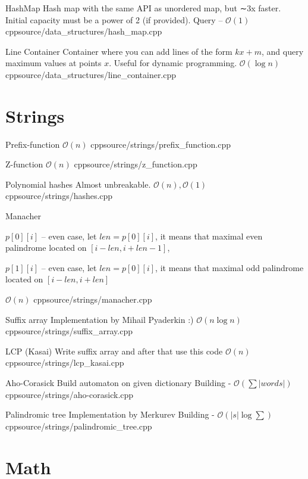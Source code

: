\documentclass[landscape, 10pt, a4paper, oneside, twocolumn]{extarticle}
\begin{document}
\Algorithm
{HashMap}
{Hash map with the same API as unordered map, but ∼3x faster. Initial capacity must be a power of 2 (if provided).}
{Query – $\mathcal{O}(1)$}
{cpp}{source/data_structures/hash_map.cpp}

\Algorithm
{Line Container}
{Container where you can add lines of the form $kx+m$, and query maximum values at points $x$. Useful for dynamic programming.}
{$\mathcal{O}(\log n)$}
{cpp}{source/data_structures/line_container.cpp}





\section{Strings}

\Algorithm
{Prefix-function}
{}
{$\mathcal{O}(n)$}
{cpp}{source/strings/prefix_function.cpp}

\Algorithm
{Z-function}
{}
{$\mathcal{O}(n)$}
{cpp}{source/strings/z_function.cpp}

\Algorithm
{Polynomial hashes}
{Almost unbreakable.}
{$\mathcal{O}(n), \mathcal{O}(1)$}
{cpp}{source/strings/hashes.cpp}

\Algorithm
{Manacher}
{$p[0][i]$ – even case, let $len = p[0][i]$,
it means that maximal even palindrome located on $[i - len, i + len - 1]$,

$p[1][i]$ – even case, let $len = p[0][i]$,
it means that maximal odd palindrome located on $[i - len, i + len]$
}
{$\mathcal{O}(n)$}
{cpp}{source/strings/manacher.cpp}

\Algorithm
{Suffix array}
{Implementation by Mihail Pyaderkin :)}
{$\mathcal{O}(n \log n)$}
{cpp}{source/strings/suffix_array.cpp}

\Algorithm
{LCP (Kasai)}
{Write suffix array and after that use this code}
{$\mathcal{O}(n)$}
{cpp}{source/strings/lcp_kasai.cpp}

\Algorithm
{Aho-Corasick}
{Build automaton on given dictionary}
{Building - $\mathcal{O}(\sum|words|)$}
{cpp}{source/strings/aho-corasick.cpp}


\Algorithm
{Palindromic tree}
{Implementation by Merkurev}
{Building - $\mathcal{O}(|s| \log \sum)$}
{cpp}{source/strings/palindromic_tree.cpp}





\section{Math}
\end{document}
